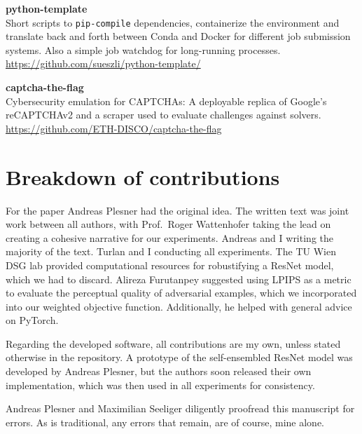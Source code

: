\documentclass[a4paper, oneside]{discothesis}
\newcommand{\linebreaks}{\vspace*{0.5em}}
\begin{document}
\linebreaks
	
\begin{spacing}{1}
	\textbf{python-template} \\
	Short scripts to \texttt{pip-compile} dependencies, containerize the environment and translate back and forth between Conda and Docker for different job submission systems. Also a simple job watchdog for long-running processes. \\ 
	\url{https://github.com/sueszli/python-template/}
\end{spacing}
	
\linebreaks
	
\begin{spacing}{1}
	\textbf{captcha-the-flag} \\
	Cybersecurity emulation for CAPTCHAs: A deployable replica of Google's reCAPTCHAv2 and a scraper used to evaluate challenges against solvers. \\
	\url{https://github.com/ETH-DISCO/captcha-the-flag}
\end{spacing}

\section*{Breakdown of contributions}

For the paper Andreas Plesner had the original idea. The written text was joint work between all authors, with Prof.\ Roger Wattenhofer taking the lead on creating a cohesive narrative for our experiments. Andreas and I writing the majority of the text. Turlan and I conducting all experiments. The TU Wien DSG lab provided computational resources for robustifying a ResNet model, which we had to discard. Alireza Furutanpey suggested using LPIPS as a metric to evaluate the perceptual quality of adversarial examples, which we incorporated into our weighted objective function. Additionally, he helped with general advice on PyTorch.

Regarding the developed software, all contributions are my own, unless stated otherwise in the repository. A prototype of the self-ensembled ResNet model was developed by Andreas Plesner, but the authors soon released their own implementation, which was then used in all experiments for consistency.

Andreas Plesner and Maximilian Seeliger diligently proofread this manuscript for errors. As is traditional, any errors that remain, are of course, mine alone.

\tableofcontents
\end{document}

